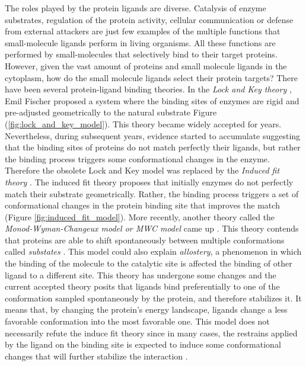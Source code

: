 \documentclass[11pt, b5paper,twoside]{tesi_upf}
\begin{document}
\par The roles played by the protein ligands are diverse. Catalysis of enzyme substrates, regulation of the protein activity, cellular communication or defense from external attackers are just few examples of the multiple functions that small-molecule ligands perform in living organisms. All these functions are performed by small-molecules that selectively bind to their target proteins. However, given the vast amount of proteins and small molecule ligands in the cytoplasm, how do the small molecule ligands select their protein targets? There have been several protein-ligand binding theories. In the \textit{Lock and Key theory} \cite{Cramer1994}, Emil Fischer proposed a system where the binding sites of enzymes are rigid and pre-adjusted geometrically to the natural substrate Figure (\ref{fig:lock_and_key_model}). This theory became widely accepted for years. Nevertheless, during subsequent years, evidence started to accumulate suggesting that the binding sites of proteins do not match perfectly their ligands, but rather the binding process triggers some conformational changes in the enzyme. Therefore the obsolete Lock and Key model was replaced by the \textit{Induced fit theory} \cite{Koshland1959}. The induced fit theory proposes that initially enzymes do not perfectly match their substrate geometrically. Rather, the binding process triggers a set of conformational changes in the protein binding site that improves the match (Figure \ref{fig:induced_fit_model}). More recently, another theory called the \textit{Monod-Wyman-Changeux model or MWC model} came up \cite{Monod1965}. This theory contends that proteins are able to shift spontaneously between multiple conformations called \textit{substates} \cite{Kitao1998, Petsko1984}. This model could also explain \textit{allostery}, a phenomenon in which the binding of the molecule to the catalytic site is affected the binding of other ligand to a different site. This theory has undergone some changes and the current accepted theory posits that ligands bind preferentially to one of the conformation sampled spontaneously by the protein, and therefore stabilizes it. It means that, by changing the protein's energy landscape, ligands change a less favorable conformation into the most favorable one. This model does not necessarily refute the induce fit theory since in many cases, the restrains applied by the ligand on the binding site is expected to induce some conformational changes that will further stabilize the interaction \cite{Foote1994, James2003}. 
\end{document}

